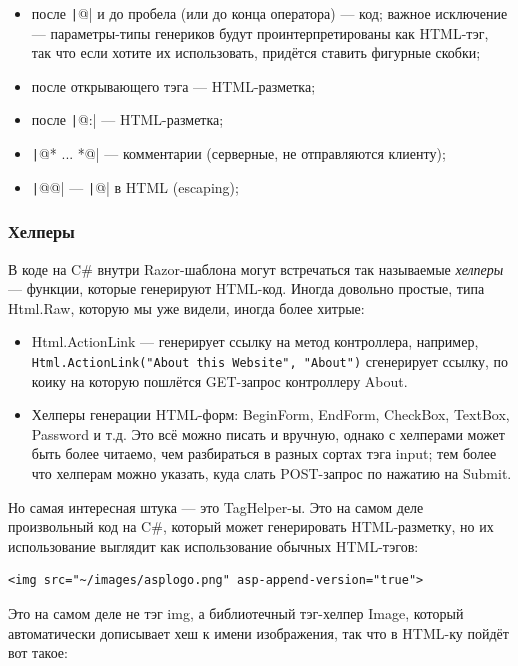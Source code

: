 \documentclass[a5paper]{article}
\begin{document}
\begin{itemize}
    \item после \texttt|@| и до пробела (или до конца оператора) --- код; важное исключение --- параметры-типы генериков будут проинтерпретированы как HTML-тэг, так что если хотите их использовать, придётся ставить фигурные скобки;
    \item после открывающего тэга --- HTML-разметка;
    \item после \texttt|@:| --- HTML-разметка;
    \item \texttt|@* ... *@| --- комментарии (серверные, не отправляются клиенту);
    \item \texttt|@@| --- \texttt|@| в HTML (escaping);
\end{itemize}

\subsubsection{Хелперы}

В коде на C\# внутри Razor-шаблона могут встречаться так называемые \emph{хелперы} --- функции, которые генерируют HTML-код. Иногда довольно простые, типа Html.Raw, которую мы уже видели, иногда более хитрые:

\begin{itemize}
    \item Html.ActionLink --- генерирует ссылку на метод контроллера, например, \texttt{Html.ActionLink("About this Website", "About")} сгенерирует ссылку, по коику на которую пошлётся GET-запрос контроллеру About.
    \item Хелперы генерации HTML-форм: BeginForm, EndForm, CheckBox, TextBox, Password и т.д. Это всё можно писать и вручную, однако с хелперами может быть более читаемо, чем разбираться в разных сортах тэга input; тем более что хелперам можно указать, куда слать POST-запрос по нажатию на Submit.
\end{itemize}

Но самая интересная штука --- это TagHelper-ы. Это на самом деле произвольный код на C\#, который может генерировать HTML-разметку, но их использование выглядит как использование обычных HTML-тэгов:

\begin{verbatim}
<img src="~/images/asplogo.png" asp-append-version="true">
\end{verbatim}

Это на самом деле не тэг img, а библиотечный тэг-хелпер Image, который автоматически дописывает хеш к имени изображения, так что в HTML-ку пойдёт вот такое:
\end{document}
